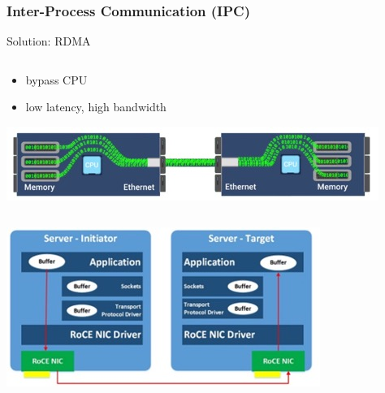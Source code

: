 \begin{frame}
\frametitle{Inter-Process Communication (IPC)}
\begin{block}{Solution: RDMA}
\begin{column}{.5\textwidth}
\begin{itemize}
	\item bypass CPU
	\item low latency, high bandwidth
\end{itemize} 
\includegraphics[width=\textwidth]{fig23/rdma0.jpg}
\end{column}
\begin{column}{.5\textwidth}
\includegraphics[width=\textwidth]{fig23/rdma2.jpg}
\end{column}
\end{block}
\end{frame}


